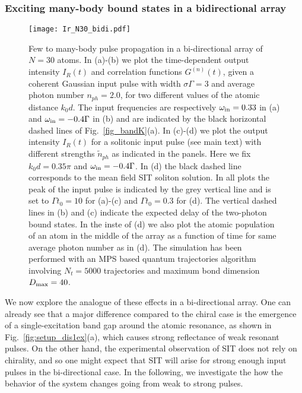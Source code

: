 \documentclass[pra,twocolumn,showpacs,preprintnumbers,amsmath,amssymb]{revtex4-1}
\begin{document}
\subsubsection{Exciting many-body bound states in a bidirectional array}
 
\begin{figure}
\texttt{[image: Ir\_N30\_bidi.pdf]}%
\caption{Few to many-body pulse propagation in a bi-directional array of $N=30$ atoms. In (a)-(b) we plot the time-dependent output intensity $I_R(t)$ and correlation functions $G^{(n)}(t)$, given a coherent Gaussian input pulse with width $\sigma\Gamma=3$ and average photon number $n_{ph}=2.0$, for two different values of the atomic distance $k_0d$. The input frequencies are respectively $\omega_{\rm in}=0.33$ in (a) and $\omega_{\rm in}=-0.4\Gamma$ in (b) and are indicated by the black horizontal dashed lines of Fig.~\ref{fig_bandK}(a). In (c)-(d) we plot the output intensity $I_R(t)$ for a solitonic input pulse (see main text) with different strengths $\tilde n_{ph}$ as indicated in the panels. Here we fix $k_0d=0.35\pi$ and $\omega_{\rm in}=-0.4\Gamma$. In (d) the black dashed line corresponds to  the mean field SIT soliton solution. In all plots the peak of the input pulse is indicated by the grey vertical line and is set to $\Gamma t_0=10$ for (a)-(c) and  $\Gamma t_0=0.3$ for (d). The vertical dashed lines in  (b) and (c) indicate  the expected delay of the two-photon bound states. In the inste of (d) we also plot the atomic population of an atom in the middle of the array  as a function of time for same average photon number as in (d).  The simulation has been performed with an MPS based quantum trajectories algorithm involving $N_t=5000$ trajectories and maximum bond dimension $D_{\rm max}=40$.}
\label{fig:pulse_bidi}
\end{figure}

We now explore the analogue of these effects in a bi-directional array. One can already see that a major difference compared to the chiral case is the emergence of a single-excitation band gap around the atomic resonance, as shown in Fig.~\ref{fig:setup_dis1ex}(a), which causes strong reflectance of weak resonant pulses. On the other hand, the experimental observation of SIT does not rely on chirality, and so one might expect that SIT will arise for strong enough input pulses in the bi-directional case. In the following, we investigate the how the behavior of the system changes going from weak to strong pulses.
\end{document}
